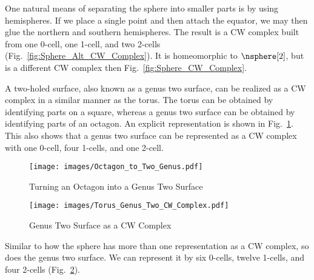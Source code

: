 \documentclass{book}                                                           %
\begin{document}
            \hfill
            \begin{minipage}[t]{0.62\textwidth}
                \begin{example}
                    One natural means of separating the sphere into smaller
                    parts is by using hemispheres. If we place a single point
                    and then attach the equator, we may then glue the northern
                    and southern hemispheres. The result is a CW complex built
                    from one 0-cell, one 1-cell, and two 2-cells
                    (Fig.~\ref{fig:Sphere_Alt_CW_Complex}). It is homeomorphic
                    to $\nsphere[2]$, but is a different CW complex then
                    Fig.~\ref{fig:Sphere_CW_Complex}.
                \end{example}
            \end{minipage}
            \par\vspace{2.5ex}
            \begin{example}
                A two-holed surface, also known as a genus two surface, can be
                realized as a CW complex in a similar manner as the torus. The
                torus can be obtained by identifying parts on a square, whereas
                a genus two surface can be obtained by identifying parts of an
                octagon. An explicit representation is shown in
                Fig.~\ref{fig:Octagon_to_Genus_Two}. This also shows that a
                genus two surface can be represented as a CW complex with one
                0-cell, four 1-cells, and one 2-cell.
            \end{example}
            \begin{figure}[H]
                \centering
                \captionsetup{type=figure}
                \texttt{[image: images/Octagon\_to\_Two\_Genus.pdf]}
                \caption{Turning an Octagon into a Genus Two Surface}
                \label{fig:Octagon_to_Genus_Two}
            \end{figure}
            \begin{figure}[H]
                \centering
                \captionsetup{type=figure}
                \texttt{[image: images/Torus\_Genus\_Two\_CW\_Complex.pdf]}
                \caption{Genus Two Surface as a CW Complex}
                \label{fig:Genus_Two_CW_Complex}
            \end{figure}
            \begin{example}
                Similar to how the sphere has more than one representation as a
                CW complex, so does the genus two surface. We can represent it
                by six 0-cells, twelve 1-cells, and four 2-cells
                (Fig.~\ref{fig:Genus_Two_CW_Complex}).
            \end{example}
\end{document}
